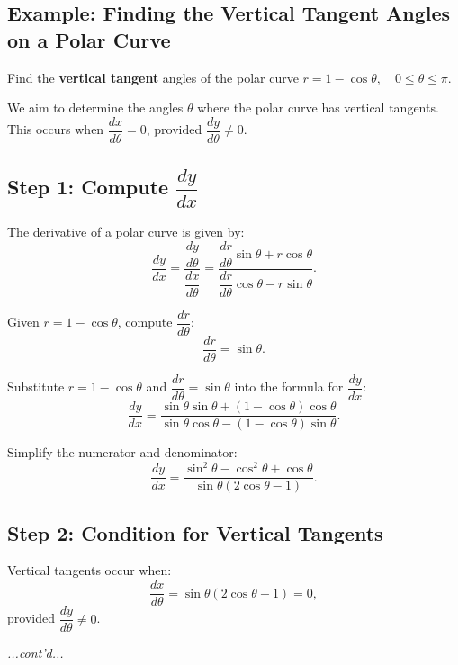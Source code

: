 \documentclass{article}
\begin{document}
\subsection*{Example: Finding the Vertical Tangent Angles on a Polar Curve}
\begin{examplebox}
Find the \textbf{vertical tangent} angles of the polar curve \( r = 1 - \cos\theta, \quad 0 \leq \theta \leq \pi \).

\begin{solutionbox}
We aim to determine the angles \( \theta \) where the polar curve has vertical tangents. This occurs when \( \dfrac{dx}{d\theta} = 0 \), provided \( \dfrac{dy}{d\theta} \neq 0 \).

\subsection*{Step 1: Compute \( \dfrac{dy}{dx} \)}
The derivative of a polar curve is given by:
\[
    \dfrac{dy}{dx} = \dfrac{\dfrac{dy}{d\theta}}{\dfrac{dx}{d\theta}} = 
    \dfrac{\dfrac{dr}{d\theta}\sin\theta + r\cos\theta}{\dfrac{dr}{d\theta}\cos\theta - r\sin\theta}.
\]

Given \( r = 1 - \cos\theta \), compute \( \dfrac{dr}{d\theta} \):
\[
    \dfrac{dr}{d\theta} = \sin\theta.
\]

Substitute \( r = 1 - \cos\theta \) and \( \dfrac{dr}{d\theta} = \sin\theta \) into the formula for \( \dfrac{dy}{dx} \):
\[
    \dfrac{dy}{dx} = 
    \dfrac{\sin\theta\sin\theta + (1 - \cos\theta)\cos\theta}{\sin\theta\cos\theta - (1 - \cos\theta)\sin\theta}.
\]

Simplify the numerator and denominator:
\[
    \dfrac{dy}{dx} = 
    \dfrac{\sin^2\theta - \cos^2\theta + \cos\theta}{\sin\theta(2\cos\theta - 1)}.
\]

\subsection*{Step 2: Condition for Vertical Tangents}
Vertical tangents occur when:
\[
    \dfrac{dx}{d\theta} = \sin\theta(2\cos\theta - 1) = 0,
\]
provided \( \dfrac{dy}{d\theta} \neq 0 \).
\end{solutionbox}
\textit{...cont'd...}
\end{examplebox}
\end{document}
